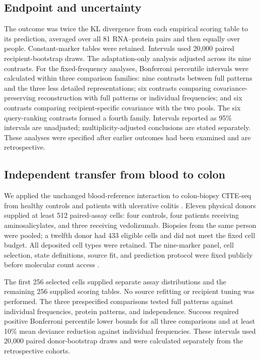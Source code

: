 \documentclass[pdflatex,sn-vancouver-num,iicol]{sn-jnl}
\begin{document}
\subsection{Endpoint and uncertainty}
The outcome was twice the KL divergence from each empirical scoring table to
its prediction, averaged over all 81 RNA--protein pairs and then equally over
people. Constant-marker tables were retained. Intervals used 20,000 paired
recipient-bootstrap draws. The adaptation-only analysis adjusted across its
nine contrasts. For the fixed-frequency analyses, Bonferroni percentile intervals were calculated within
three comparison families: nine contrasts between full patterns and the three
less detailed representations; six contrasts comparing covariance-preserving reconstruction
with full patterns or individual frequencies; and six contrasts comparing
recipient-specific covariance with the two pools. The six query-ranking
contrasts formed a fourth family. Intervals reported as 95\% intervals are
unadjusted; multiplicity-adjusted conclusions are stated separately. These analyses were specified
after earlier outcomes had been examined and are retrospective.

\subsection{Independent transfer from blood to colon}
We applied the unchanged blood-reference interaction to colon-biopsy CITE-seq
from healthy controls and patients with ulcerative colitis
\cite{mennillo2024}. Eleven physical donors supplied at least 512 paired-assay
cells: four controls, four patients receiving aminosalicylates, and three
receiving vedolizumab. Biopsies from the same person were pooled; a twelfth
donor had 433 eligible cells and did not meet the fixed cell budget.
All deposited cell types were retained. The nine-marker panel, cell selection,
state definitions, source fit, and prediction protocol were fixed publicly
before molecular count access \cite{colontest2026}.

The first 256 selected cells supplied separate assay distributions and the
remaining 256 supplied scoring tables. No source refitting or recipient
tuning was performed. The three prespecified comparisons tested full patterns
against individual frequencies, protein patterns, and independence. Success
required positive Bonferroni percentile lower bounds for all three comparisons
and at least 10\% mean deviance reduction against individual frequencies.
These intervals used 20,000 paired donor-bootstrap draws and were calculated
separately from the retrospective cohorts.
\end{document}
